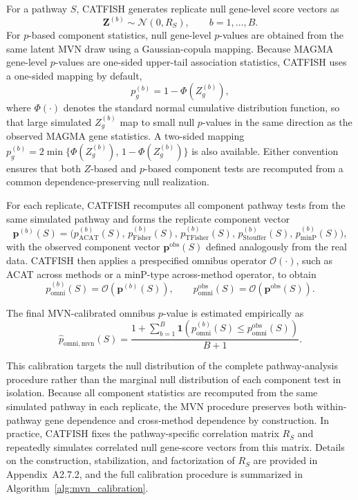 \documentclass[unnumsec,webpdf,contemporary,large]{oup-authoring-template}%
\theoremstyle{thmstyleone}%
\theoremstyle{thmstyletwo}%
\theoremstyle{thmstylethree}%
\begin{document}
For a pathway $S$, CATFISH generates replicate null gene-level score vectors as
\[
\mathbf{Z}^{(b)} \sim \mathcal{N}(0,R_S),
\qquad b=1,\dots,B.
\]
For $p$-based component statistics, null gene-level $p$-values are obtained from the same latent MVN draw using a Gaussian-copula mapping. Because MAGMA gene-level $p$-values are one-sided upper-tail association statistics, CATFISH uses a one-sided mapping by default,
\[
p_g^{(b)} = 1-\Phi\!\left(Z_g^{(b)}\right),
\]
where $\Phi(\cdot)$ denotes the standard normal cumulative distribution function, so that large simulated $Z_g^{(b)}$ map to small null $p$-values in the same direction as the observed MAGMA gene statistics. A two-sided mapping $p_g^{(b)}=2\min\{\Phi(Z_g^{(b)}),\,1-\Phi(Z_g^{(b)})\}$ is also available. Either convention ensures that both $Z$-based and $p$-based component tests are recomputed from a common dependence-preserving null realization.

For each replicate, CATFISH recomputes all component pathway tests from the same simulated pathway and forms the replicate component vector
\[
\mathbf{p}^{(b)}(S)
=
\Big(
p_{\mathrm{ACAT}}^{(b)}(S),\,
p_{\mathrm{Fisher}}^{(b)}(S),\,
p_{\mathrm{TFisher}}^{(b)}(S),\,
p_{\mathrm{Stouffer}}^{(b)}(S),\,
p_{\mathrm{minP}}^{(b)}(S)
\Big),
\]
with the observed component vector $\mathbf{p}^{\mathrm{obs}}(S)$ defined analogously from the real data. CATFISH then applies a prespecified omnibus operator $\mathcal{O}(\cdot)$, such as ACAT across methods or a minP-type across-method operator, to obtain
\[
p_{\mathrm{omni}}^{(b)}(S)
=
\mathcal{O}\!\left(\mathbf{p}^{(b)}(S)\right),
\qquad
p_{\mathrm{omni}}^{\mathrm{obs}}(S)
=
\mathcal{O}\!\left(\mathbf{p}^{\mathrm{obs}}(S)\right).
\]

The final MVN-calibrated omnibus $p$-value is estimated empirically as
\[
\hat p_{\mathrm{omni,mvn}}(S)
=
\frac{
1+\sum_{b=1}^{B}\mathbf{1}\!\left(
p_{\mathrm{omni}}^{(b)}(S)\le p_{\mathrm{omni}}^{\mathrm{obs}}(S)
\right)
}{
B+1
}.
\]

This calibration targets the null distribution of the complete pathway-analysis procedure rather than the marginal null distribution of each component test in isolation. Because all component statistics are recomputed from the same simulated pathway in each replicate, the MVN procedure preserves both within-pathway gene dependence and cross-method dependence by construction. In practice, CATFISH fixes the pathway-specific correlation matrix $R_S$ and repeatedly simulates correlated null gene-score vectors from this matrix. Details on the construction, stabilization, and factorization of $R_S$ are provided in Appendix~A2.7.2, and the full calibration procedure is summarized in Algorithm~\ref{alg:mvn_calibration}.
\end{document}
